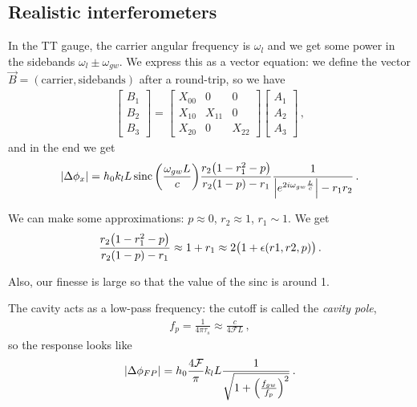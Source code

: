 \documentclass[main.tex]{subfiles}
\begin{document}
\subsection{Realistic interferometers}



In the TT gauge, the carrier angular frequency is \(\omega_{l}\) and we get some power in the sidebands \(\omega_{l} \pm \omega_{gw}\). 
We express this as a vector equation: we define the vector \(\vec{B} = (\text{carrier}, \text{sidebands})\) after a round-trip, so we have  
%
\begin{subequations}
\begin{align}
\left[\begin{array}{c}
B_1  \\ 
B_2  \\ 
B_3 
\end{array}\right]
=
\left[\begin{array}{ccc}
X_{00}  & 0 & 0 \\ 
X_{10}  & X_{11}  & 0 \\ 
X_{20}  & 0 & X_{22} 
\end{array}\right]
\left[\begin{array}{c}
A_1  \\ 
A_2  \\ 
A_3 
\end{array}\right]
\,,
\end{align}
\end{subequations}
%
and in the end we get 
%
\begin{align}
\abs{\Delta \phi_{x}} = h_0 k_{l} L \operatorname{sinc} \qty( \frac{\omega_{gw}L}{c}) \frac{r_2 \qty(1 - r_1^2 - p )}{r_2 (1 - p) - r_1 }  \frac{1}{\abs{e^{2 i \omega_{gw} \frac{L}{c}}} - r_1 r_2 }
\,.
\end{align}

We can make some approximations: \(p \approx 0 \), \(r_2 \approx 1\), \(r_1 \sim 1\). We get 
%
\begin{align}
\frac{r_2 \qty(1 - r_1^2 - p )}{r_2 (1 - p) - r_1 } \approx 1 + r_1 \approx 2 \qty(1 + \epsilon (r1, r2, p))
\,.
\end{align}

Also, our finesse is large so that the value of the sinc is around 1. 

The cavity acts as a low-pass frequency: the cutoff is called the \emph{cavity pole}, 
%
\begin{align}
f_p = \frac{1}{4 \pi \tau_{s}} \approx \frac{c}{4 \mathcal{F}L} 
\,,
\end{align}
%
so the response looks like 
%
\begin{align}
\abs{\Delta \phi_{FP}} = h_0 \frac{4 \mathcal{F}}{\pi } k_l L \frac{1}{\sqrt{1 + \qty( \frac{f_{gw}}{f_p})^2}}
\,.
\end{align}
\end{document}
